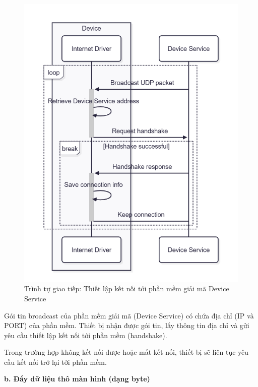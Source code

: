 \begin{figure}[!ht]
     \centering
    \includegraphics[width=0.8\linewidth]{Figures/Chap3_Device-firm-implementation-handshake.png}
    \caption{Trình tự giao tiếp: Thiết lập kết nối tới phần mềm giải mã Device Service}
    \label{fig:hinh3.9}
\end{figure}

Gói tin broadcast của phần mềm giải mã (Device Service) có chứa địa chỉ (IP và PORT) của phần mềm. Thiết bị nhận được gói tin, lấy thông tin địa chỉ và gửi yêu cầu thiết lập kết nối tới phần mềm (handshake).

Trong trường hợp không kết nối được hoặc mất kết nối, thiết bị sẽ liên tục yêu cầu kết nối trở lại tới phần mềm.

\textbf{b. Đẩy dữ liệu thô màn hình (dạng byte)}

